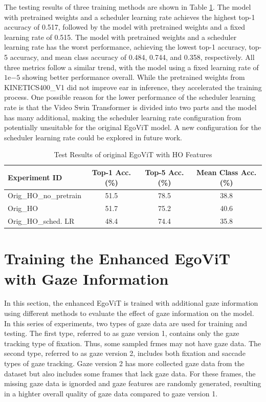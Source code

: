 \clearpage
The testing results of three training methods are shown in Table \ref{tab:original-egovit}. The model with pretrained weights and a scheduler learning rate achieves the highest top-1 accuracy of 0.517, followed by the model with pretrained weights and a fixed learning rate of 0.515. The model with pretrained weights and a scheduler learning rate has the worst performance, achieving the lowest top-1 accuracy, top-5 accuracy, and mean class accuracy of 0.484, 0.744, and 0.358, respectively. All three metrics follow a similar trend, with the model using a fixed learning rate of $1 \mathrm{e}{-5}$ showing better performance overall. While the pretrained weights from KINETICS400\_V1 did not improve \gls{ear} in inference, they accelerated the training process. One possible reason for the lower performance of the scheduler learning rate is that the Video Swin Transformer is divided into two parts and the model has many additional, making the scheduler learning rate configuration from \cite{liu_video_2021} potentially unsuitable for the original EgoViT model. A new configuration for the scheduler learning rate could be explored in future work.
\newline

\begin{table}[h]
    \centering
    \caption{Test Results of original EgoViT with HO Features}
    \begin{tabular}{lccc}
    \hline\hline
    Experiment ID & Top-1 Acc.(\%) & Top-5 Acc.(\%) & Mean Class Acc.(\%) \\
    \hline
    Orig\_HO\_no\_pretrain       & 51.5 & 78.5 & 38.8 \\
    Orig\_HO                     & 51.7 & 75.2 & 40.6 \\
    Orig\_HO\_sched. LR          & 48.4 & 74.4 & 35.8 \\
    \hline\hline
    \end{tabular}
    \label{tab:original-egovit}
\end{table}

\section{Training the Enhanced EgoViT with Gaze Information}
\label{sec:training_egovit_with_gaze}
In this section, the enhanced EgoViT is trained with additional gaze information using different methods to evaluate the effect of gaze information on the model. In this series of experiments, two types of gaze data are used for training and testing. The first type, referred to as gaze version 1, contains only the gaze tracking type of fixation. Thus, some sampled frmes may not have gaze data. The second type, referred to as gaze version 2, includes both fixation and saccade types of gaze tracking. Gaze version 2 has more collected gaze data from the dataset but also includes some frames that lack gaze data. For these frames, the missing gaze data is ignorded and gaze features are randomly generated, resulting in a highter overall quality of gaze data compared to gaze version 1.

